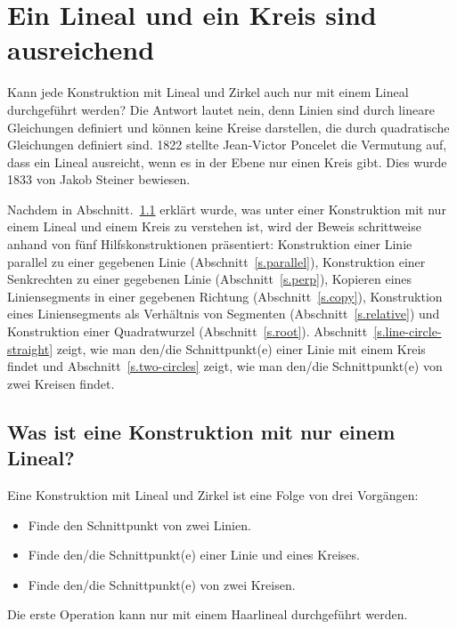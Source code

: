 
\chapter{Ein Lineal und ein Kreis sind ausreichend}\label{c.straightedge}


Kann jede Konstruktion mit Lineal und Zirkel auch nur mit einem Lineal durchgeführt werden? Die Antwort lautet nein, denn Linien sind durch lineare Gleichungen definiert und können keine Kreise darstellen, die durch quadratische Gleichungen definiert sind. 1822 stellte Jean-Victor Poncelet die Vermutung auf, dass ein Lineal ausreicht, wenn es in der Ebene nur einen Kreis gibt. Dies wurde 1833 von Jakob Steiner bewiesen.

Nachdem in Abschnitt.~\ref{s.se-what} erklärt wurde, was unter einer Konstruktion mit nur einem Lineal und einem Kreis zu verstehen ist, wird der Beweis schrittweise anhand von fünf Hilfskonstruktionen präsentiert: Konstruktion einer Linie parallel zu einer gegebenen Linie (Abschnitt~\ref{s.parallel}), Konstruktion einer Senkrechten zu einer gegebenen Linie (Abschnitt~\ref{s.perp}), Kopieren eines Liniensegments in einer gegebenen Richtung (Abschnitt~\ref{s.copy}), Konstruktion eines Liniensegments als Verhältnis von Segmenten (Abschnitt~\ref{s.relative}) und Konstruktion einer Quadratwurzel (Abschnitt~\ref{s.root}). Abschnitt~\ref{s.line-circle-straight} zeigt, wie man den/die Schnittpunkt(e) einer Linie mit einem Kreis findet und Abschnitt~\ref{s.two-circles} zeigt, wie man den/die Schnittpunkt(e) von zwei Kreisen findet.

\section{Was ist eine Konstruktion mit nur einem Lineal?}\label{s.se-what}
Eine Konstruktion mit Lineal und Zirkel ist eine Folge von drei Vorgängen:
\begin{itemize}
\item Finde den Schnittpunkt von zwei Linien.
\item Finde den/die Schnittpunkt(e) einer Linie und eines Kreises.
\item Finde den/die Schnittpunkt(e) von zwei Kreisen.
\end{itemize}
Die erste Operation kann nur mit einem Haarlineal durchgeführt werden.


